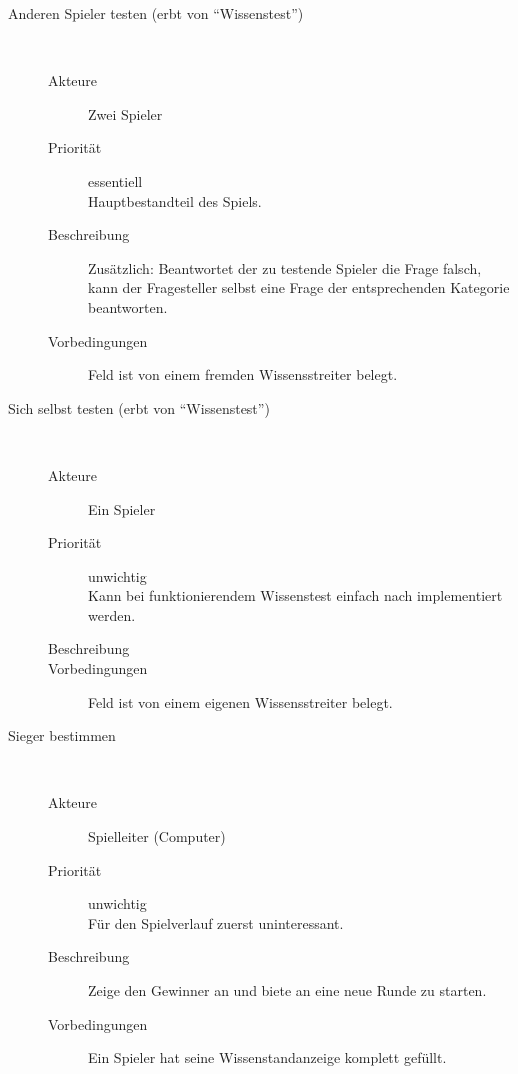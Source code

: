 \documentclass{report}
\begin{document}
\begin{description}
   \item[Anderen Spieler testen (erbt von "`Wissenstest"')]~\par
   \begin{description}
      \item[Akteure] Zwei Spieler
      \item[Priorität] essentiell\\Hauptbestandteil des Spiels.
      \item[Beschreibung] Zusätzlich: Beantwortet der zu testende Spieler die Frage falsch, kann der Fragesteller selbst eine Frage der entsprechenden Kategorie beantworten.
      \item[Vorbedingungen] Feld ist von einem fremden Wissensstreiter belegt.
   \end{description}


   \item[Sich selbst testen (erbt von "`Wissenstest"')]~\par
   \begin{description}
      \item[Akteure] Ein Spieler
      \item[Priorität] unwichtig\\Kann bei funktionierendem Wissenstest einfach nach implementiert werden.
      \item[Beschreibung]
      \item[Vorbedingungen] Feld ist von einem eigenen Wissensstreiter belegt.
   \end{description}


   \item[Sieger bestimmen]~\par
   \begin{description}
      \item[Akteure] Spielleiter (Computer)
      \item[Priorität] unwichtig\\Für den Spielverlauf zuerst uninteressant.
      \item[Beschreibung] Zeige den Gewinner an und biete an eine neue Runde zu starten.
      \item[Vorbedingungen] Ein Spieler hat seine Wissenstandanzeige komplett gefüllt.
   \end{description}
\end{description}
\end{document}
